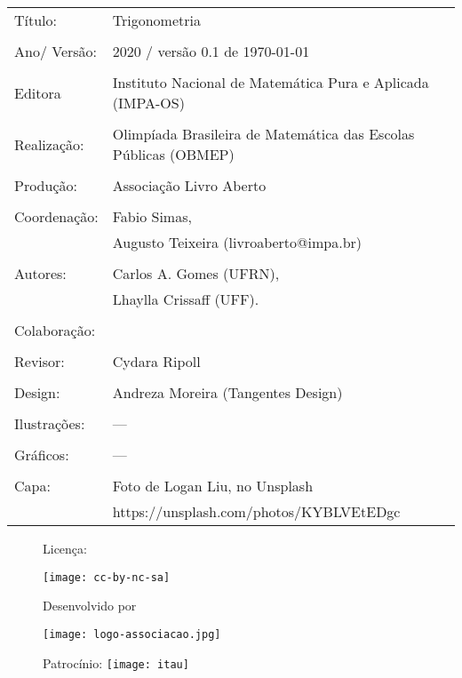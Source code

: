 \begin{tabular}{p{}p{}}
Título: & Trigonometria\\
\\
Ano/ Versão: & 2020 / versão 0.1 de \today\\
\\
Editora & Instituto Nacional de Matem\'atica Pura e Aplicada (IMPA-OS)\\
\\
Realização:& Olimp\'iada Brasileira de Matem\'atica das Escolas P\'ublicas (OBMEP)\\
\\
Produção:& Associação Livro Aberto\\
\\
Coordenação: & Fabio Simas, \\
			&  Augusto Teixeira (livroaberto@impa.br)\\
\\
  Autores: & Carlos A. Gomes (UFRN),\\
             & Lhaylla Crissaff (UFF).\\
        
\\
Colaboração: & \\
\\
Revisor: & Cydara Ripoll \\

\\
Design: & Andreza Moreira (Tangentes Design) \\
\\
  Ilustrações: & --- \\ 
\\
Gráficos: & ---\\
\\
  Capa: & Foto de Logan Liu, no Unsplash \\
  		& https://unsplash.com/photos/KYBLVEtEDgc \\

\end{tabular}
\vspace{.5cm}



\begin{figure}[b]
\begin{minipage}[l]{5cm}
\centering

{\large Licença:}

  \texttt{[image: cc-by-nc-sa]}
\end{minipage}\hfill
\begin{minipage}[c]{5cm}
\centering
{\large Desenvolvido por}

\texttt{[image: logo-associacao.jpg]}
\end{minipage}
\begin{minipage}[r]{5cm}
\centering

{\large Patrocínio:}
  \vspace{1em}
  \texttt{[image: itau]}
\end{minipage}
\end{figure}

